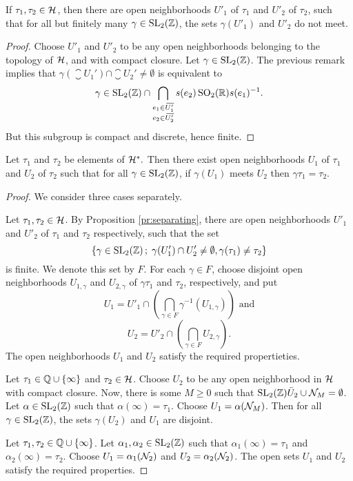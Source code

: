 \begin{prop} \label{pr:separating}
 If $\tau_1, \tau_2\in\mathcal{H}$, then there are open neighborhoods $U'_1$ of $\tau_1$ and $U'_2$ of $\tau_2$, such that for all but finitely many $\gamma\in\operatorname{SL}_2(\mathbb{Z})$, the sets $\gamma(U'_1)$ and $U'_2$ do not meet.
\end{prop}

\begin{proof}
 Choose $U'_1$ and $U'_2$ to be any open neighborhoods belonging to the topology of $\mathcal{H}$, and with compact closure. Let $\gamma\in\operatorname{SL}_2(\mathbb{Z})$. The previous remark implies that $\gamma(\closure{U_1'})\cap\closure{U_2'}\neq\emptyset$ is equivalent to \[\gamma \in \operatorname{SL}_2(\mathbb{Z}) \cap \bigcap_{\substack{e_1\in{}\mkern3mu\overline{\mkern-3muU_1'}\\e_2\in{}\mkern3mu\overline{\mkern-3muU_2'}}}s(e_2)\operatorname{SO}_2(\mathbb{R})s(e_1)^{-1}.\] But this subgroup is compact and discrete, hence finite.
\end{proof}

\begin{prop}
 Let $\tau_1$ and $\tau_2$ be elements of $\mathcal{H}^*.$ Then there exist open neighborhoods $U_1$ of $\tau_1$ and $U_2$ of $\tau_2$ such that for all $\gamma\in\operatorname{SL}_2(\mathbb{Z})$, if $\gamma(U_1)$ meets $U_2$ then $\gamma\tau_1 = \tau_2$.
\end{prop}

\begin{proof}
 We consider three cases separately.
 
  Let $\tau_1,\tau_2\in\mathcal{H}$. By Proposition \ref{pr:separating}, there are open neighborhoods $U'_1$ and $U'_2$ of $\tau_1$ and $\tau_2$ respectively, such that the set
 \[\{\gamma\in\operatorname{SL}_2(\mathbb{Z})\,;\; \gamma(U'_1)\cap U'_2\neq\emptyset, \gamma(\tau_1)\neq \tau_2\}\]
 is finite. We denote this set by $F$. For each $\gamma\in F$, choose disjoint open neighborhoods $U_{1,\gamma}$ and $U_{2,\gamma}$ of $\gamma\tau_1$ and $\tau_2$, respectively, and put
 \[U_1 = U'_1\cap\left(\bigcap_{\gamma\in F}\gamma^{-1}(U_{1,\gamma})\right)\text{ and}\]
 \[U_2 = U'_2\cap\left(\bigcap_{\gamma\in F}U_{2,\gamma}\right).\]
 The open neighborhoods $U_1$ and $U_2$ satisfy the required propertieties.
 
  Let $\tau_1\in\mathbb{Q}\cup\{\infty\}$ and $\tau_2\in\mathcal{H}$. Choose $U_2$ to be any open neighborhood in $\mathcal{H}$ with compact closure. Now, there is some $M\geq 0$ such that $\operatorname{SL}_2(\mathbb{Z})\bar{U}_2\cup\mathcal{N}_M=\emptyset$. Let $\alpha\in\operatorname{SL}_2(\mathbb{Z})$ such that $\alpha(\infty)=\tau_1$. Choose $U_1=\alpha(\mathcal{N}_M)$. Then for all $\gamma\in\operatorname{SL}_2(\mathbb{Z})$, the sets $\gamma(U_2)$ and $U_1$ are disjoint.
 
  Let $\tau_1,\tau_2\in\mathbb{Q}\cup\{\infty\}$. Let $\alpha_1,\alpha_2\in\operatorname{SL}_2(\mathbb{Z})$ such that $\alpha_1(\infty)=\tau_1$ and $\alpha_2(\infty)=\tau_2$. Choose $U_1=\alpha_1(\mathcal{N}_2)$ and $U_2=\alpha_2(\mathcal{N}_2)$. The open sets $U_1$ and $U_2$ satisfy the required properties.
\end{proof}

